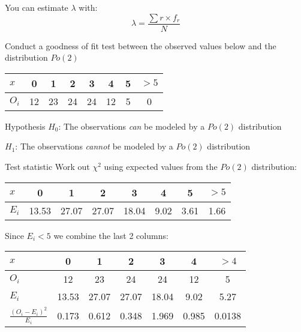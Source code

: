         You can estimate $\lambda$ with: $$ \lambda = \frac{\sum{r \times f_r}}{N} $$
        
        \begin{example}
        {
            Conduct a goodness of fit test between the observed values below and the distribution $Po(2)$

            \begin{center}
            \begin{tabular}{l|c|c|c|c|c|c|c}
            $x$ & 0 & 1 & 2 & 3 & 4 & 5 & $>5$ \\
            \hline
            $O_i$ & 12 & 23 & 24 & 24 & 12 & 5 & 0 \\
            \end{tabular}
            \end{center}
        }

        \begin{step}{Hypothesis}
        $H_0$: The observations \textit{can} be modeled by a $Po(2)$ distribution

        $H_1$: The observations \textit{cannot} be modeled by a $Po(2)$ distribution
        \end{step}

        \begin{step}{Test statistic}
        Work out $\chi^2$ using expected values from the $Po(2)$ distribution:

        \begin{center}
        \begin{tabular}{l|c|c|c|c|c|c|c}
        $x$ & 0 & 1 & 2 & 3 & 4 & 5 & $>5$ \\
        \hline
        $E_i$ & 13.53 & 27.07 & 27.07 & 18.04 & 9.02 & 3.61 & 1.66 \\
        \end{tabular}
        \end{center}

        Since $E_i < 5$ we combine the last 2 columns:

        \begin{center}
        \begin{tabular}{l|c|c|c|c|c|c}
        $x$ & 0 & 1 & 2 & 3 & 4 & $>4$ \\
        \hline
        $O_i$ & 12 & 23 & 24 & 24 & 12 & 5 \\
        $E_i$ & 13.53 & 27.07 & 27.07 & 18.04 & 9.02 & 5.27 \\
        $\displaystyle\frac{(O_i - E_i)^2}{E_i}$ & 0.173 & 0.612 & 0.348 & 1.969 & 0.985 & 0.0138 \\
        \end{tabular}
        \end{center}


\end{step}
\end{example}
